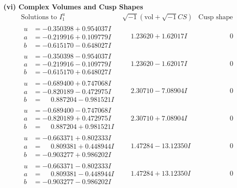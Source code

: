 \documentclass[1p]{elsarticle_modified}
\theoremstyle{definition}
\newcommand{\I}{\sqrt{-1}}
\begin{document}
\newpage\flushleft \textbf{(vi) Complex Volumes and Cusp Shapes}
$$\begin{array}{c|c|c}  
\text{Solutions to }I^u_{1}& \I (\text{vol} + \sqrt{-1}CS) & \text{Cusp shape}\\
 \hline 
\begin{aligned}
u &= -0.350398 + 0.954037 I \\
a &= -0.219916 + 0.109779 I \\
b &= -0.615170 - 0.648027 I\end{aligned}
 & \phantom{-}1.23620 + 1.62017 I & \phantom{-0.000000 } 0 \\ \hline\begin{aligned}
u &= -0.350398 - 0.954037 I \\
a &= -0.219916 - 0.109779 I \\
b &= -0.615170 + 0.648027 I\end{aligned}
 & \phantom{-}1.23620 - 1.62017 I & \phantom{-0.000000 } 0 \\ \hline\begin{aligned}
u &= -0.689400 + 0.747068 I \\
a &= -0.820189 - 0.472975 I \\
b &= \phantom{-}0.887204 - 0.981521 I\end{aligned}
 & \phantom{-}2.30710 - 7.08904 I & \phantom{-0.000000 } 0 \\ \hline\begin{aligned}
u &= -0.689400 - 0.747068 I \\
a &= -0.820189 + 0.472975 I \\
b &= \phantom{-}0.887204 + 0.981521 I\end{aligned}
 & \phantom{-}2.30710 + 7.08904 I & \phantom{-0.000000 } 0 \\ \hline\begin{aligned}
u &= -0.663371 + 0.802333 I \\
a &= \phantom{-}0.809381 + 0.448944 I \\
b &= -0.903277 + 0.986202 I\end{aligned}
 & \phantom{-}1.47284 - 13.12350 I & \phantom{-0.000000 } 0 \\ \hline\begin{aligned}
u &= -0.663371 - 0.802333 I \\
a &= \phantom{-}0.809381 - 0.448944 I \\
b &= -0.903277 - 0.986202 I\end{aligned}
 & \phantom{-}1.47284 + 13.12350 I & \phantom{-0.000000 } 0 \\ \hline\begin{aligned}

\end{aligned}
\end{array}$$
\end{document}
